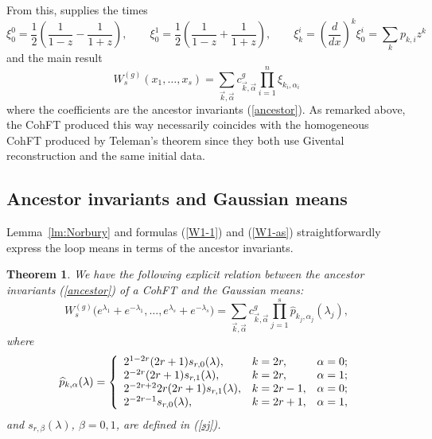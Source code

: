 \documentclass[11pt]{article}
\def\be{\begin{equation}}
\def\ee{\end{equation}}
\newcommand{\modm}{\mathcal{M}}
\def\beq{\begin{equation}}
\def\eeq{\end{equation}}
\theoremstyle{plain}
\newtheorem{theorem}{Theorem}
\theoremstyle{definition}
\def\beq{\begin{equation}}
\def\eeq{\end{equation}}
\begin{document}
From this, \cite{DOSSIde} supplies the times
\be
\xi^0_0=\frac{1}{2}\left(\frac{1}{1-z}-\frac{1}{1+z}\right),\qquad
\xi^1_0=\frac{1}{2}\left(\frac{1}{1-z}+\frac{1}{1+z}\right),\qquad
\xi^i_k=\left(\frac{d}{dx}\right)^k\xi^i_0=\sum_k p_{k,i}z^k
\label{question}
\ee
and the main result
$$W^{(g)}_s(x_1,\dots,x_s)=\sum_{\vec{k},\vec{\alpha}} c^g_{\vec{k},\vec{\alpha}} \prod_{i=1}^n \xi_{k_i,\alpha_i}$$
where the coefficients are the ancestor invariants (\ref{ancestor}).
As remarked above, the CohFT produced this way necessarily coincides with the homogeneous CohFT produced by Teleman's theorem since they both use Givental reconstruction and the same initial data.


\subsection{Ancestor invariants and Gaussian means}\label{ss:Ancestor-Gauss}

Lemma~\ref{lm:Norbury} and formulas (\ref{W1-1}) and (\ref{W1-as}) straightforwardly express
the loop means in terms of  the ancestor invariants.

\begin{theorem}\label{th:Wgs2ckl}
We have the following explicit relation between the ancestor invariants (\ref{ancestor}) of a CohFT
and the Gaussian means:
\beq
W^{(g)}_s\bigl(e^{\lambda_1}+e^{-\lambda_1},\dots,e^{\lambda_s}+e^{-\lambda_s}\bigr)
=\sum_{\vec{k},\vec{\alpha}}c^g_{\vec{k},\vec{\alpha}}\prod_{j=1}^s \widehat p_{k_j,\alpha_j}(\lambda_j),
\eeq
where
\beq
\widehat p_{k,\alpha}(\lambda)=\left\{\begin{array}{lll}
2^{1-2r}(2r+1)s_{r,0}(\lambda),&k=2r,&\alpha=0;\cr
2^{-2r}(2r+1)s_{r,1}(\lambda),&k=2r,&\alpha=1;\cr
2^{-2r+2}2r(2r+1)s_{r,1}(\lambda),&k=2r-1,&\alpha=0;\cr
2^{-2r-1}s_{r,0}(\lambda),&k=2r+1,&\alpha=1,
\end{array}
\right.
\label{pk2}
\eeq
and $s_{r,\beta}(\lambda)$, $\beta=0,1$, are defined in (\ref{sj}).
\end{theorem}
\end{document}
